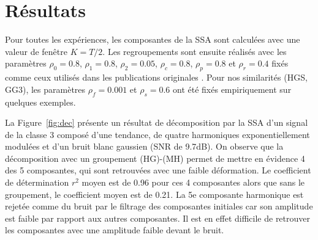 \documentclass{gretsi}
\newcommand{\set}[1]{\left \{ 1, \dots, #1 \right \}}
\begin{document}


    
       
\vspace{-.4cm}
\section{Résultats}
\label{sec:res}
\vspace{-.2cm}


Pour toutes les expériences, les composantes de la SSA sont calculées avec une valeur de fenêtre $K=T/2$.
Les regroupements sont ensuite réalisés avec les paramètres $\rho_0=0.8$, $\rho_1=0.8$, $\rho_2=0.05$, $\rho_c=0.8$, $\rho_p=0.8$ et $\rho_r=0.4$ fixés comme ceux utilisés dans les publications originales \cite{abalov_14_auto, alvarez_13_auto}. 
Pour nos similarités (HGS, GG3), les paramètres $\rho_f=0.001$ et $\rho_s=0.6$ ont été fixés empiriquement sur quelques exemples.


La Figure~\ref{fig:dec} présente un résultat de décomposition par la SSA d'un signal de la classe 3 composé d'une tendance, de quatre harmoniques exponentiellement modulées et d'un bruit blanc gaussien (SNR de 9.7dB).
On observe que la décomposition  avec un groupement (HG)-(MH) permet de mettre en évidence 4 des 5 composantes, qui sont retrouvées avec une faible déformation. 
Le coefficient de détermination $r^2$ moyen est de 0.96 pour ces 4 composantes alors que sans le groupement, le coefficient moyen est de 0.21.
La 5e composante harmonique est rejetée comme du bruit par le filtrage des composantes initiales car son amplitude est faible par rapport aux autres composantes.
Il est en effet difficile de retrouver les composantes avec une amplitude faible devant le bruit.
\end{document}
